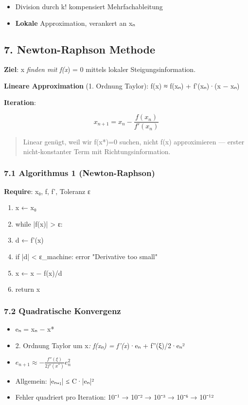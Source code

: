\documentclass[11pt, a4paper]{article}
\begin{document}
\begin{itemize}
  \item Division durch k! kompensiert Mehrfachableitung
  \item \textbf{Lokale} Approximation, verankert an xₙ
\end{itemize}


\subsection{7. Newton-Raphson Methode}

\textbf{Ziel}: x\textit{ finden mit f(x}) = 0 mittels lokaler Steigungsinformation.


\textbf{Lineare Approximation} (1. Ordnung Taylor): f(x) ≈ f(xₙ) + f'(xₙ)·(x − xₙ)


\textbf{Iteration}:

\[
x_{n+1} = x_n - \frac{f(x_n)}{f'(x_n)}
\]


\begin{quote}
Linear genügt, weil wir f(x*)=0 suchen, nicht f(x) approximieren — erster nicht-konstanter Term mit Richtungsinformation.
\end{quote}


\subsubsection{7.1 Algorithmus 1 (Newton-Raphson)}
\textbf{Require}: x₀, f, f', Toleranz ε

\begin{enumerate}
  \item x ← x₀
  \item while |f(x)| > ε:
  \item d ← f'(x)
  \item if |d| < ε\_machine: error "Derivative too small"
  \item x ← x − f(x)/d
  \item return x
\end{enumerate}


\subsubsection{7.2 Quadratische Konvergenz}
\begin{itemize}
  \item eₙ = xₙ − x*
  \item 2. Ordnung Taylor um x\textit{: f(xₙ) = f'(x})·eₙ + f''(ξ)/2·eₙ²
  \item $e_{n+1} \approx -\frac{f''(\xi)}{2f'(x^*)} e_n^2$
  \item Allgemein: |eₙ₊₁| ≤ C·|eₙ|²
  \item Fehler quadriert pro Iteration: 10⁻¹ → 10⁻² → 10⁻³ → 10⁻⁶ → 10⁻¹²
\end{itemize}
\end{document}
